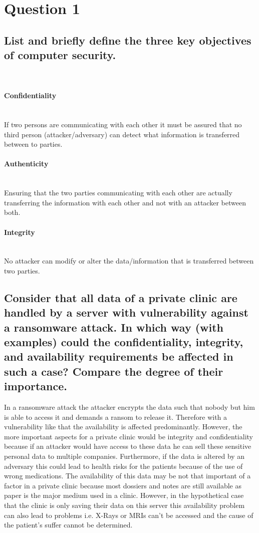 \documentclass{report}
\begin{document}
	\section{Question 1}
	\startsection
		\renewcommand{\thesubsection}{\thesection.\Alph{subsection}}
		\subsection{List and briefly define the three key objectives of computer security.}
		\startsubsection
			~ \vspace*{-2em}
			\paragraph{Confidentiality} \hfill \\
			If two persons are communicating with each other it must be assured that no third person (attacker/adversary) can detect what information is transferred between to parties.
			\paragraph{Authenticity} \hfill \\
			Ensuring that the two parties communicating with each other are actually transferring the information with each other and not with an attacker between both.
			\paragraph{Integrity} \hfill \\
			No attacker can modify or alter the data/information that is transferred between two parties.
		\closesection
		\subsection{Consider that all data of a private clinic are handled by a server with vulnerability against a ransomware attack. In which way (with examples) could the confidentiality, integrity, and availability requirements be affected in such a case? Compare the degree of their importance.}
		\startsubsection
			In a ransomware attack the attacker encrypts the data such that nobody but him is able to access it and demands a ransom to release it. Therefore with a vulnerability like that the availability is affected predominantly. However, the more important aspects for a private clinic would be integrity and confidentiality because if an attacker would have access to these data he can sell these sensitive personal data to multiple companies. Furthermore, if the data is altered by an adversary this could lead to health risks for the patients because of the use of wrong medications. The availability of this data may be not that important of a factor in a private clinic because most dossiers and notes are still available as paper is the major medium used in a clinic. However, in the hypothetical case that the clinic is only saving their data on this server this availability problem can also lead to problems i.e. X-Rays or MRIs can't be accessed and the cause of the patient's suffer cannot be determined.
		\closesection
	\closesection
\end{document}
